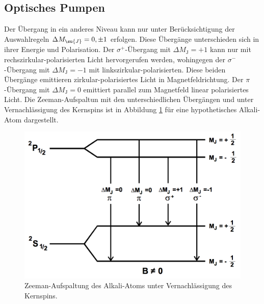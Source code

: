 \newpage
\subsection{Optisches Pumpen}
Der Übergang in ein anderes Niveau kann nur unter Berücksichtigung der Auswahlregeln
$\Delta M_{\su{J}} = 0, \pm1$ erfolgen. Diese Übergänge unterschieden sich in ihrer Energie
und Polarisation.
Der $\sigma^{+}$-Übergang mit $\Delta M_{\text{J}} = +1$ kann nur mit rechszirkular-polarisierten Licht hervorgerufen werden,
wohingegen der $\sigma^{-}$-Übergang mit $\Delta M_{\text{J}} = -1$ mit linkszirkular-polarisierten.
Diese beiden Übergänge emittieren zirkular-polarisiertes Licht in Magnetfeldrichtung.
Der $\pi$-Übergang mit $\Delta M_{\text{J}} = 0$ emittiert parallel zum Magnetfeld linear polarisiertes
Licht. \newline
Die Zeeman-Aufspaltun mit den unterschiedlichen Übergängen und unter Vernachlässigung des Kernspins ist in Abbildung \ref{fig:übergänge}
für eine hypothetisches Alkali-Atom dargestellt.
\begin{figure}
    \centering
    \includegraphics[scale = 0.35]{pictures/übergänge.png}
    \caption{Zeeman-Aufspaltung des Alkali-Atoms unter Vernachlässigung des Kernspins.\cite{1}}
    \label{fig:übergänge}
\end{figure}

